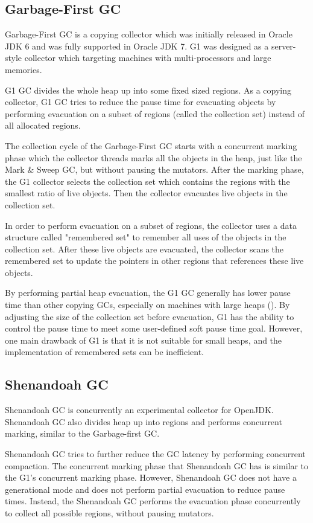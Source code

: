 \subsection{Garbage-First GC}

Garbage-First GC is a copying collector which was initially released in Oracle JDK 6
and was fully supported in Oracle JDK 7. G1 was designed as a server-style collector
which targeting machines with multi-processors and large memories. 

G1 GC divides the whole heap up into some fixed sized regions. 
As a copying collector, G1 GC tries to reduce the pause time for evacuating objects
by performing evacuation on a subset of regions (called the collection set) instead of
all allocated regions.

The collection cycle of the Garbage-First GC starts with a concurrent marking phase
which the collector threads marks all the objects in the heap, just like the Mark \&
Sweep GC, but without pausing the mutators.
After the marking phase, the G1 collector selects the collection set which contains
the regions with the smallest ratio of live objects.
Then the collector evacuates live objects in the collection set.

In order to perform evacuation on a subset of regions, the collector uses a data structure
called "remembered set" to remember all uses of the objects in the collection set.
After these live objects are evacuated, the collector scans the remembered set to
update the pointers in other regions that references these live objects.

By performing partial heap evacuation, the G1 GC generally has lower pause time
than other copying GCs, especially on machines with large heaps (\cite{detlefs2004garbage}).
By adjusting the size of the collection set before evacuation, G1 has the ability
to control the pause time to meet some user-defined soft pause time goal.
However, one main drawback of G1 is that it is not suitable for small heaps,
and the implementation of remembered sets can be inefficient.

\subsection{Shenandoah GC}

Shenandoah GC is concurrently an experimental collector for OpenJDK.
Shenandoah GC also divides heap up into regions and performs concurrent marking,
similar to the Garbage-first GC.

Shenandoah GC tries to further reduce the GC latency by performing concurrent
compaction. The concurrent marking phase that Shenandoah GC has is similar to
the G1's concurrent marking phase. However, Shenandoah GC does not have a generational
mode and does not perform partial evacuation to reduce pause times.
Instead, the Shenandoah GC performs the evacuation phase concurrently to collect
all possible regions, without pausing mutators.

